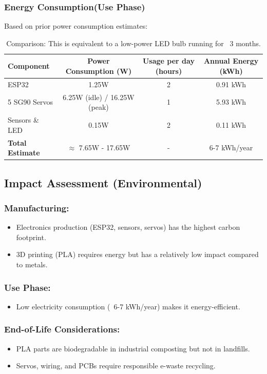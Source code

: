 \documentclass{article}
\begin{document}
\subsubsection{Energy Consumption(Use Phase)}
Based on prior power consumption estimates:
\begin{table}[h]
    \hspace*{-2.2cm}
    \centering
    \begin{tabular}{|l|c|c|c|}
        \hline
        \textbf{Component} & \textbf{Power Consumption (W)} & \textbf{Usage per day (hours)} & \textbf{Annual Energy (kWh)} \\ 
        \hline
        ESP32 & 1.25W & 2 & 0.91 kWh \\ 
        \hline
        5 SG90 Servos & 6.25W (idle) / 16.25W (peak) & 1 & 5.93 kWh \\ 
        \hline
        Sensors \& LED & 0.15W & 2 & 0.11 kWh \\ 
        \hline
        \textbf{Total Estimate} & $\approx$ 7.65W - 17.65W & - & 6-7 kWh/year \\ 
        \hline
    \end{tabular}
    \caption{Comparison: This is equivalent to a low-power LED bulb running for ~3 months.}
    \label{tab:energy_consumption}
\end{table}
\subsection{Impact Assessment (Environmental)}
\subsubsection{Manufacturing:}
\begin{itemize}
\item Electronics production (ESP32, sensors, servos) has the highest carbon footprint.
\item 3D printing (PLA) requires energy but has a relatively low impact compared to metals.
\end{itemize}
\subsubsection{Use Phase:}
\begin{itemize}
\item Low electricity consumption (~6-7 kWh/year) makes it energy-efficient.
\end{itemize}
\subsubsection{End-of-Life Considerations:}
\begin{itemize}
\item PLA parts are biodegradable in industrial composting but not in landfills.
\item Servos, wiring, and PCBs require responsible e-waste recycling.
\end{itemize}
\end{document}
